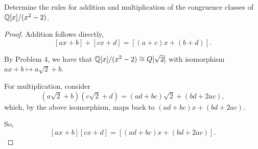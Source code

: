 \documentclass[../hw7]{subfiles}
\begin{document}
\begin{problem}
Determine the rules for addition and multiplication of the congruence classes of $\mathbb{Q}[x]/(x^2-2)$.
\end{problem}
\begin{proof}
	Addition follows directly, \[
		[ax+b]+[cx+d]=[(a+c)x+(b+d)]
		.\]

	By Problem 4, we have that $\mathbb{Q}[x]/(x^2-2) \cong Q[\sqrt{2} ]$ with isomorphism $ax+b \mapsto a\sqrt{2}+b $.

	For multiplication, consider \[
		(a\sqrt{2}+b )(c\sqrt{2}+d )=(ad+bc)\sqrt{2}+(bd + 2ac)
		,\] which, by the above isomorphism, maps back to $(ad+bc)x+(bd+2ac)$.

	So, \[
		[ax+b][cx+d]=[(ad+bc)x+(bd+2ac)]
		.\]
\end{proof}
\end{document}
